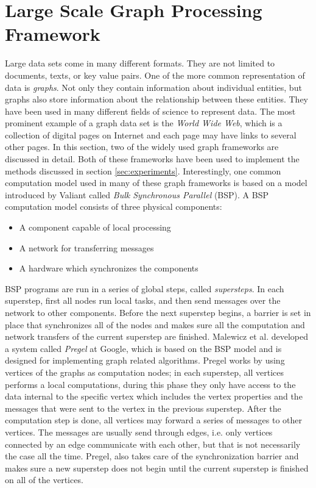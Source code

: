 \documentclass[english]{tktltiki}
\begin{document}
\section{Large Scale Graph Processing Framework}
\label{sec:biggraph}
Large data sets come in many different formats. They are not limited to documents, texts, or key value pairs. One of the more common representation of data is \textit{graphs}. Not only they contain information about individual entities, but graphs also store information about the relationship between these entities. They have been used in many different fields of science to represent data. The most prominent example of a graph data set is the \textit{World Wide Web}, which is a collection of digital pages on Internet and each page may have links to several other pages. In this section, two of the widely used graph frameworks are discussed in detail. Both of these frameworks have been used to implement the methods discussed in section \ref{sec:experiments}. Interestingly, one common computation model used in many of these graph frameworks is based on a model introduced by Valiant \cite{valiant90} called \textit{Bulk Synchronous Parallel} (BSP). A BSP computation model consists of three physical components: 
\begin{itemize}
\item
A component capable of local processing
\item
A network for transferring messages
\item
A hardware which synchronizes the components
\end{itemize}

BSP programs are run in a series of global steps, called \textit{supersteps}. In each superstep, first all nodes run local tasks, and then send messages over the network to other components. Before the next superstep begins, a barrier is set in place that synchronizes all of the nodes and makes sure all the computation and network transfers of the current superstep are finished. Malewicz et al. \cite{malewicz10} developed a system called \textit{Pregel} at Google, which is based on the BSP model and is designed for implementing graph related algorithms. Pregel works by using vertices of the graphs as computation nodes; in each superstep, all vertices performs a local computations, during this phase they only have access to the data internal to the specific vertex which includes the vertex properties and the messages that were sent to the vertex in the previous superstep. After the computation step is done, all vertices may forward a series of messages to other vertices. The messages are usually send through edges, i.e. only vertices connected by an edge communicate with each other, but that is not necessarily the case all the time. Pregel, also takes care of the synchronization barrier and makes sure a new superstep does not begin until the current superstep is finished on all of the vertices.
\end{document}
